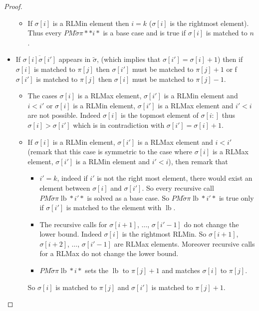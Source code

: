 \documentclass[a4paper]{llncs}
\newcommand{\ptext}{\pi}
\newcommand{\ppattern}{\sigma}
\newcommand{\PM}{PM}
\DeclareMathOperator{\lb}{lb}
\begin{document}
\begin{proof}
\begin{itemize}
\begin{itemize}
		\item If $\sigma[i]$ is a RLMin element then $i=k$ ($\sigma[i]$ is the rightmost element). Thus every $\PM{\widetilde{\sigma}}{\ptext}{*}{*}{i}{*}$ is a base case and is true if $\sigma[i]$ is matched to $n$.

	\end{itemize}



	\item  If $\overline{\ppattern[i]\ppattern[i']}$ appears in $\widetilde{\sigma}$,  (which implies that $\ppattern[i']=\ppattern[i]+1$) then if $\ppattern[i]$ is matched to $\ptext[j]$ then $\ppattern[i']$ must be matched to $\ptext[j]+1$
	or f $\ppattern[i']$ is matched to $\ptext[j]$ then $\ppattern[i]$ must be matched to $\ptext[j]-1$.

		\begin{itemize}

			\item The cases $\ppattern[i]$ is a RLMax element, $\ppattern[i']$ is a RLMin element and $i<i'$ or  $\ppattern[i]$ is a RLMin element, $\ppattern[i']$ is a RLMax element and $i'<i$ are not possible.
			Indeed $\ppattern[i]$ is the topmost element of $\ppattern[i:]$ thus $\ppattern[i] > \ppattern[i']$ which is in contradiction with
			$\ppattern[i']=\ppattern[i]+1$.

			\item If $\ppattern[i]$ is a RLMin element, $\ppattern[i']$ is a RLMax element and $i<i'$ (remark that this case is symmetric to the case where $\ppattern[i]$ is a RLMax element, $\ppattern[i']$ is a RLMin element and $i'<i$), then
			remark that
			\begin{itemize}
				\item $i'=k$, indeed if $i'$ is not the right most element, there would exist an element between
				$\sigma[i]$ and $\sigma[i']$. So every recursive call
				$\PM{\widetilde{\sigma}}{\ptext}{\lb}{*}{i'}{*}$
				is solved as a base case. So $\PM{\widetilde{\sigma}}{\ptext}{\lb}{*}{i'}{*}$ is true only if $\sigma[i']$ is matched to the element with $\lb$.
				\item The recursive calls for $\sigma[i+1]$, $\ldots$, $\sigma[i'-1]$ do not change the lower bound.
				Indeed $\ppattern[i]$ is the rightmost RLMin.
				So $\sigma[i+1]$, $\sigma[i+2]$, $\ldots$, $\sigma[i'-1]$ are RLMax elements. Moreover
				recursive calls for a RLMax do not change the lower bound.
				\item $\PM{\widetilde{\sigma}}{\ptext}{\lb}{*}{i}{*}$ sets
				the $\lb$ to $\ptext[j]+1$ and matches $\sigma[i]$ to $\ptext[j]$.
			\end{itemize}
			So $\sigma[i]$ is matched to $\ptext[j]$ and
			$\sigma[i']$ is matched to $\ptext[j]+1$.


\end{itemize}
\end{itemize}
\end{proof}
\end{document}
